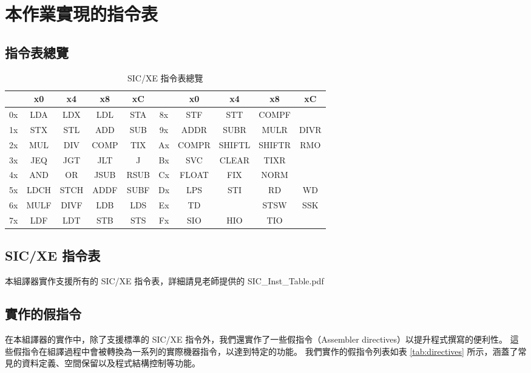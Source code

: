 \chapter{本作業實現的指令表}

\section{指令表總覽}

\begin{table}[hbtp]
    \centering
    \ttfamily
    \caption{SIC/XE 指令表總覽}
    \label{tab:opcode_overview}
    \begin{tabular}{|c|cccc||c|cccc|}
        \hline
           & x0   & x4   & x8   & xC   &    & x0    & x4     & x8     & xC   \\
        \hline
        0x & LDA  & LDX  & LDL  & STA  & 8x & STF   & STT    & COMPF  &      \\
        1x & STX  & STL  & ADD  & SUB  & 9x & ADDR  & SUBR   & MULR   & DIVR \\
        2x & MUL  & DIV  & COMP & TIX  & Ax & COMPR & SHIFTL & SHIFTR & RMO  \\
        3x & JEQ  & JGT  & JLT  & J    & Bx & SVC   & CLEAR  & TIXR   &      \\
        4x & AND  & OR   & JSUB & RSUB & Cx & FLOAT & FIX    & NORM   &      \\
        5x & LDCH & STCH & ADDF & SUBF & Dx & LPS   & STI    & RD     & WD   \\
        6x & MULF & DIVF & LDB  & LDS  & Ex & TD    &        & STSW   & SSK  \\
        7x & LDF  & LDT  & STB  & STS  & Fx & SIO   & HIO    & TIO    &      \\
        \hline
    \end{tabular}
\end{table}

\section{SIC/XE 指令表}

本組譯器實作支援所有的 SIC/XE 指令表，詳細請見老師提供的 SIC\_Inst\_Table.pdf


\section{實作的假指令}

在本組譯器的實作中，除了支援標準的 SIC/XE 指令外，我們還實作了一些假指令（Assembler directives）以提升程式撰寫的便利性。
這些假指令在組譯過程中會被轉換為一系列的實際機器指令，以達到特定的功能。
我們實作的假指令列表如表 \ref{tab:directives} 所示，涵蓋了常見的資料定義、空間保留以及程式結構控制等功能。

